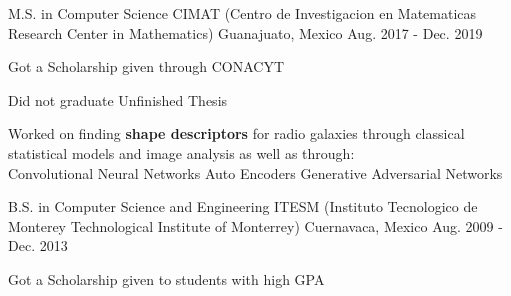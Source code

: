 

\begin{cventries}


\cventry
    {M.S. in Computer Science} %
    {CIMAT (Centro de Investigacion en Matematicas {\enskip\cdotp\enskip} Research Center in Mathematics)} %
    {Guanajuato, Mexico} %
    {Aug. 2017 - Dec. 2019} %
    {
    \begin{cvitems} %
        \item {Got a Scholarship given through CONACYT}
        \item {Did not graduate {\enskip\cdotp\enskip} Unfinished Thesis}
        \item {Worked on finding \textbf{shape descriptors} for radio galaxies through classical statistical models and image analysis as well as through:\\ 
        {\enskip\cdotp\enskip} Convolutional Neural Networks 
        {\enskip\cdotp\enskip} Auto Encoders 
        {\enskip\cdotp\enskip} Generative Adversarial Networks}
    \end{cvitems}
    }
  \cventry
    {B.S. in Computer Science and Engineering} %
    {ITESM ({Instituto Tecnologico de Monterey\enskip\cdotp\enskip} Technological Institute of Monterrey)} %
    {Cuernavaca, Mexico} %
    {Aug. 2009 - Dec. 2013} %
    {
      \begin{cvitems} %
        \item {Got a Scholarship given to students with high GPA}
      \end{cvitems}
    }

\end{cventries}